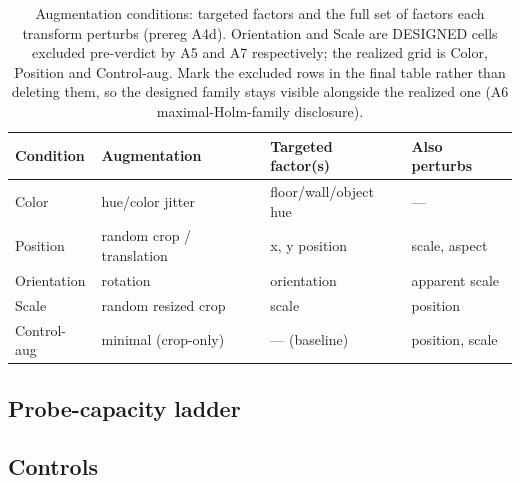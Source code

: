 \documentclass[11pt]{article}
\begin{document}
\begin{table}[H]
\centering
\caption{Augmentation conditions: targeted factors and the full set of
factors each transform perturbs (prereg A4d). Orientation and Scale are
DESIGNED cells excluded pre-verdict by A5 and A7 respectively; the realized
grid is Color, Position and Control-aug. Mark the excluded rows in the
final table rather than deleting them, so the designed family stays visible
alongside the realized one (A6 maximal-Holm-family disclosure).}
\label{tab:conditions}
\begin{tabular}{llll}
\toprule
Condition & Augmentation & Targeted factor(s) & Also perturbs \\
\midrule
Color       & hue/color jitter          & floor/wall/object hue & --- \\
Position    & random crop / translation & x, y position         & scale, aspect \\
Orientation & rotation                  & orientation           & apparent scale \\
Scale       & random resized crop       & scale                 & position \\
Control-aug & minimal (crop-only)       & --- (baseline)        & position, scale \\
\bottomrule
\end{tabular}
\end{table}

\subsection{Probe-capacity ladder}

\subsection{Controls}
\end{document}
